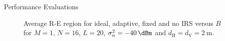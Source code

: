 \documentclass[journal]{IEEEtran}
\begin{document}
\begin{section}{Performance Evaluations}
		\begin{figure}[!t]
			\centering
			\caption{Average R-E region for ideal, adaptive, fixed and no IRS versus $B$ for $M=1$, $N=16$, $L=20$, $\sigma_n^2=\SI{-40}{\dBm}$ and $d_{\mathrm{H}}=d_{\mathrm{V}}=\SI{2}{\meter}$.}
		\end{figure}


\end{section}
\end{document}
